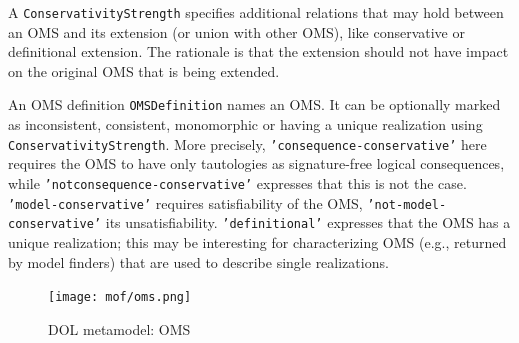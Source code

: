 \documentclass[10pt, a4paper]{isov2}
\newcommand*{\syntax}[1]{\texttt{#1}}
\begin{document}
A \syntax{ConservativityStrength} specifies additional relations that
may hold between an OMS and its extension (or union with other OMS),
like conservative or definitional extension. The rationale is that the
extension should not have impact on the original OMS that is being
extended.

An OMS definition \syntax{OMSDefinition} names an OMS.  It can be
optionally marked as inconsistent, consistent, monomorphic or having a
unique realization using \syntax{ConservativityStrength}. More precisely,
\syntax{'consequence-conser\-va\-tive'} here requires the OMS to have only
tautologies as signature-free logical consequences, while
\syntax{'not\-consequence-conservative'} expresses that this is not
the case.  \syntax{'model-conservative'} requires satisfiability of
the OMS, \syntax{'not-model-conservative'} its unsatisfiability.
\syntax{'de\-fi\-nitional'} expresses that the OMS has a unique
realization; this may be interesting for characterizing OMS
(e.g., returned by model finders) that are used to describe single
realizations.



\begin{figure}
  \centering
\vspace{-4cm}
    \texttt{[image: mof/oms.png]}
  \caption{DOL metamodel: OMS}
  \label{fig:oms}

\end{figure}
\end{document}
